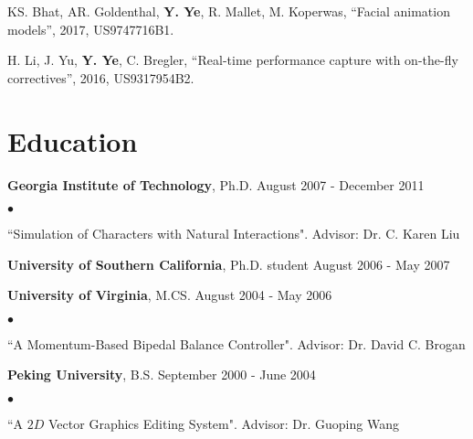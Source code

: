 \documentclass[margin,line]{res}
\newenvironment{list2}{
  \begin{list}{$\bullet$}{%
      \setlength{\itemsep}{0in}
      \setlength{\parsep}{0in} \setlength{\parskip}{0in}
      \setlength{\topsep}{0in} \setlength{\partopsep}{0in} 
      \setlength{\leftmargin}{0.2in}}}{\end{list}}
\begin{document}
\begin{resume}
\vspace*{-.1in}
KS. Bhat, AR. Goldenthal, {\bf Y. Ye}, R. Mallet, M. Koperwas, ``Facial animation models'', 2017, US9747716B1.  

\vspace*{-.1in}
H. Li, J. Yu, {\bf Y. Ye}, C. Bregler, ``Real-time performance capture with on-the-fly correctives'', 2016, US9317954B2.


\section{\sc Education}
{\bf Georgia Institute of Technology}, Ph.D.  \hfill August 2007 - December 2011 \\
\begin{list2}
\vspace*{-.15in}
\item ``Simulation of Characters with Natural Interactions". Advisor:  Dr. C. Karen Liu
\end{list2}

\vspace*{-.1in}
{\bf University of Southern California}, Ph.D. student \hfill August 2006 - May 2007

\vspace*{-.1in}
{\bf University of Virginia}, M.CS. \hfill August 2004 - May 2006 \\
\begin{list2}
\vspace*{-.15in}
\item ``A Momentum-Based Bipedal Balance Controller". Advisor: Dr. David C. Brogan
\end{list2}

\vspace*{-.1in}
{\bf Peking University}, B.S. \hfill September 2000 - June 2004 \\
\begin{list2}
\vspace*{-.15in}
\item ``A $2D$ Vector Graphics Editing System". Advisor: Dr. Guoping Wang
\end{list2}




\end{resume}
\end{document}
